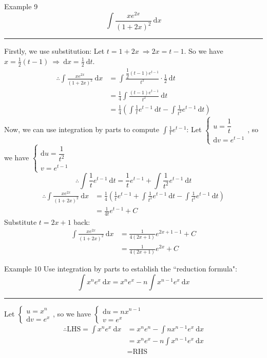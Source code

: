 \documentclass[12pt,a4paper]{article}
\def\d{{\mathrm{d}}}
\begin{document}
\begin{eg}{Example 9}
	$$\int \frac{xe^{2x}}{(1+2x)^2}\ \d x$$
	\noindent\rule[0.25\baselineskip]{\textwidth}{1pt}
	Firstly, we use substitution: Let $t=1+2x\ \Rightarrow 2x=t-1$. So we have $x=\frac{1}{2}(t-1)\ \Rightarrow\ \d x=\frac{1}{2}\ \d t$.
	$$\begin{aligned}
		\therefore \int\frac{xe^{2x}}{(1+2x)^2}\ \d x&=\int\frac{\dfrac{1}{2}(t-1)e^{t-1}}{t^2}\cdot\frac{1}{2}\ \d t\\
		&=\frac{1}{4}\int\frac{(t-1)e^{t-1}}{t^2}\ \d t\\
		&=\frac{1}{4}\left(\int\frac{1}{t}e^{t-1}\ \d t-\int\frac{1}{t^2}e^{t-1}\ \d t\right)
	\end{aligned}$$
	Now, we can use integration by parts to compute $\int\frac{1}{t}e^{t-1}$: Let $\begin{cases}u=\dfrac{1}{t}\\\d v=e^{t-1}\end{cases}$, so we have $\begin{cases}\d u=\dfrac{1}{t^2}\\v=e^{t-1}\end{cases}$
	$$\therefore\int\frac{1}{t}e^{t-1}\ \d t=\frac{1}{t}e^{t-1}+\int\frac{1}{t^2}e^{t-1}\ \d t$$
	$$\begin{aligned}
		\therefore\int \frac{xe^{2x}}{(1+2x)^2}\ \d x&=\frac{1}{4}\left(\frac{1}{t}e^{t-1}+\int\frac{1}{t^2}e^{t-1}\ \d t-\int\frac{1}{t^2}e^{t-1}\ \d t\right)\\
		&=\frac{1}{4t}e^{t-1}+C
	\end{aligned}$$
	Substitute $t=2x+1$ back:
	$$\begin{aligned}
		\int\frac{xe^{2x}}{(1+2x)^2}\ \d x&=\frac{1}{4(2x+1)}e^{2x+1-1}+C\\
		&=\frac{1}{4(2x+1)}e^{2x}+C
	\end{aligned}$$
\end{eg}
\begin{eg}{Example 10}
	Use integration by parts to establish the ``reduction formula":
	$$\int x^ne^x\ \d x=x^ne^x-n\int x^{n-1}e^x\ \d x$$
	\noindent\rule[0.25\baselineskip]{\textwidth}{1pt}
	Let $\begin{cases}u=x^n\\\d v=e^x\end{cases}$, so we have $\begin{cases}\d u=nx^{n-1}\\v=e^{x}\end{cases}$
	$$\begin{aligned}
		\therefore \text{LHS}=\int x^ne^x\ \d x&=x^ne^n-\int n x^{n-1}e^x\ \d x\\
		&=x^ne^x-n\int x^{n-1}e^x\ \d x\\
		&=\text{RHS}
	\end{aligned}$$
\end{eg}
\end{document}
